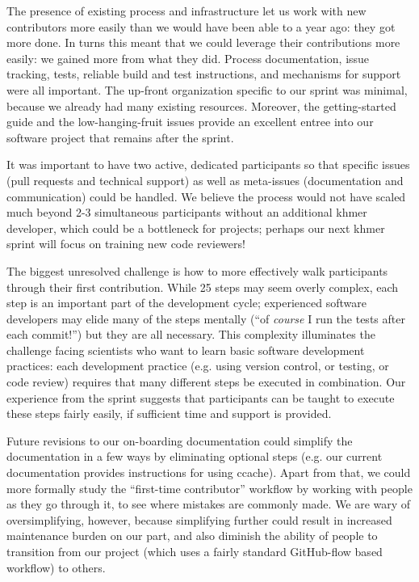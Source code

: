 \documentclass[11pt]{article}
\begin{document}
The presence of existing process and infrastructure let us work with
new contributors more easily than we would have been able to a year
ago: they got more done.  In turns this meant that we could leverage
their contributions more easily: we gained more from what they did.
Process documentation, issue tracking, tests, reliable build and test
instructions, and mechanisms for support were all important.  The
up-front organization specific to our sprint was minimal, because we
already had many existing resources.  Moreover, the getting-started
guide and the low-hanging-fruit issues provide an excellent entree
into our software project that remains after the sprint.

It was important to have two active, dedicated participants so that
specific issues (pull requests and technical support) as well as
meta-issues (documentation and communication) could be handled.  We
believe the process would not have scaled much beyond 2-3 simultaneous
participants without an additional khmer developer, which could be a
bottleneck for projects; perhaps our next khmer sprint will focus on
training new code reviewers!

The biggest unresolved challenge is how to more effectively walk
participants through their first contribution.  While 25 steps may
seem overly complex, each step is an important part of the development
cycle; experienced software developers may elide many of the steps
mentally (``of {\em course} I run the tests after each commit!'') but
they are all necessary.  This complexity illuminates the challenge
facing scientists who want to learn basic software development
practices: each development practice (e.g. using version control, or
testing, or code review) requires that many different steps be
executed in combination.  Our experience from the sprint suggests that
participants can be taught to execute these steps fairly easily, if
sufficient time and support is provided.

Future revisions to our on-boarding documentation could simplify the
documentation in a few ways by eliminating optional steps (e.g. our
current documentation provides instructions for using ccache).  Apart
from that, we could more formally study the ``first-time contributor''
workflow by working with people as they go through it, to see where
mistakes are commonly made.  We are wary of oversimplifying, however,
because simplifying further could result in increased maintenance
burden on our part, and also diminish the ability of people to
transition from our project (which uses a fairly standard GitHub-flow
based workflow) to others.
\end{document}
